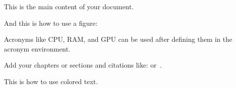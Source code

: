
This is the main \glqq{} content\grqq{} of your document.

And this is how to use a figure:

Acronyms like \ac{CPU}, \ac{RAM}, and \ac{GPU} can be used after defining them in the acronym environment.


Add your chapters or sections and citations like: \parencite{knuth1984} or~\cite{knuth1984}.

This is how to use \textcolor{FAVblue}{colored} text.